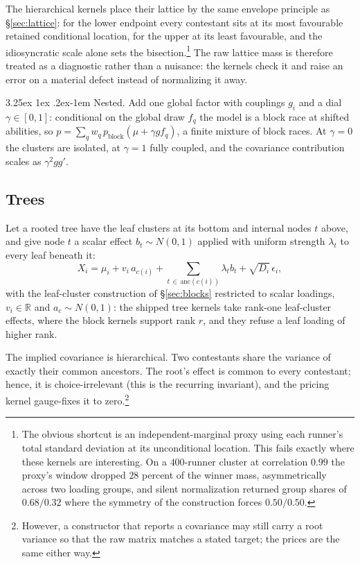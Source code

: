 \documentclass[11pt]{article}
\makeatletter
\renewcommand\paragraph{\@startsection{paragraph}{4}{\z@}%
  {3.25ex \@plus1ex \@minus.2ex}{-1em}%
  {\normalfont\normalsize\itshape}}
\newcommand{\R}{\mathbb{R}}
\makeatother
\begin{document}
The hierarchical kernels place their lattice by the same envelope
principle as \S\ref{sec:lattice}: for the lower endpoint every
contestant sits at its most favourable retained conditional location,
for the upper at its least favourable, and the idiosyncratic scale
alone sets the bisection.\footnote{The obvious shortcut is an
independent-marginal proxy using each runner's total standard deviation
at its unconditional location. This fails exactly where these kernels are
interesting. On a $400$-runner cluster at correlation $0.99$ the
proxy's window dropped $28$ percent of the winner mass, asymmetrically
across two loading groups, and silent normalization returned group
shares of $0.68/0.32$ where the symmetry of the construction forces
$0.50/0.50$.} The raw lattice mass is therefore treated as a diagnostic
rather than a nuisance: the kernels check it and raise an error on a
material defect instead of normalizing it away.

\paragraph{Nested.} Add one global factor with couplings $g_i$ and a dial
$\gamma\in[0,1]$: conditional on the global draw $f_q$ the model is a block race
at shifted abilities, so
$p=\sum_q w_q\,p_{\mathrm{block}}(\mu+\gamma g f_q)$, a finite mixture of block
races. At $\gamma=0$ the clusters are isolated, at $\gamma=1$ fully
coupled, and the covariance contribution scales as $\gamma^{2}gg'$.

\subsection{Trees}\label{sec:tree}

Let a rooted tree have the leaf clusters at its bottom and internal nodes $t$
above, and give node $t$ a scalar effect $b_t\sim N(0,1)$ applied with uniform
strength $\lambda_t$ to every leaf beneath it:
\begin{equation}
X_i=\mu_i+v_i\,a_{c(i)}+\sum_{t\,\in\,\mathrm{anc}(c(i))}\lambda_t b_t
    +\sqrt{D_i}\,\epsilon_i ,
\end{equation}
with the leaf-cluster construction of \S\ref{sec:blocks} restricted to
scalar loadings, $v_i\in\R$ and $a_c\sim N(0,1)$: the shipped tree
kernels take rank-one leaf-cluster effects, where the block kernels
support rank $r$, and they refuse a leaf loading of higher rank.

The implied covariance is hierarchical. Two contestants share the variance of
exactly their common ancestors. The root's effect is common to every contestant; hence, it
is choice-irrelevant (this is the recurring invariant), and the pricing kernel gauge-fixes it to zero.\footnote{However, a constructor that reports a covariance may still carry a root variance so
that the raw matrix matches a stated target; the prices are the same
either way.}
\end{document}
